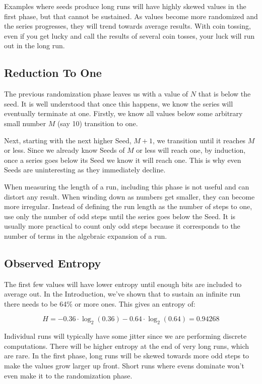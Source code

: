 \documentclass[letterpaper]{article}
\begin{document}
\begin{multicols}{2}
Examples where seeds produce long runs will have highly skewed values in the first phase, but that cannot be sustained. As values become more randomized and the series progresses, they will trend towards average results. With coin tossing, even if you get lucky and call the results of several coin tosses, your luck will run out in the long run.

\subsection{Reduction To One}

The previous randomization phase leaves us with a value of \( N \) that is below the seed. It is well understood that once this happens, we know the series will eventually terminate at one. Firstly, we know all values below some arbitrary small number \( M \) (say 10) transition to one.

Next, starting with the next higher Seed, \( M + 1 \), we transition until it reaches \( M \) or less. Since we already know Seeds of \( M \) or less will reach one, by induction, once a series goes below its Seed we know it will reach one. This is why even Seeds are uninteresting as they immediately decline.

When measuring the length of a run, including this phase is not useful and can distort any result. When winding down as numbers get smaller, they can become more irregular. Instead of defining the run length as the number of steps to one, use only the number of odd steps until the series goes below the Seed. It is usually more practical to count only odd steps because it corresponds to the number of terms in the algebraic expansion of a run.

\subsection{Observed Entropy}

The first few values will have lower entropy until enough bits are included to average out. In the Introduction, we've shown that to sustain an infinite run there needs to be 64\% or more ones. This gives an entropy of:

\[ H = -0.36 \cdot \log_2(0.36) - 0.64 \cdot \log_2(0.64) = 0.94268 \]

Individual runs will typically have some jitter since we are performing discrete computations. There will be higher entropy at the end of very long runs, which are rare. In the first phase, long runs will be skewed towards more odd steps to make the values grow larger up front. Short runs where evens dominate won't even make it to the randomization phase.


\end{multicols}
\end{document}
